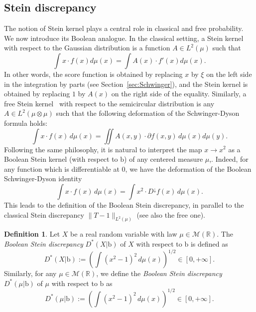 \documentclass[10pt, reqno]{amsart}
\numberwithin{equation}{section}
\theoremstyle{definition}
\newtheorem{definition}{Definition}[section]
\theoremstyle{plain}
\theoremstyle{remark}
\newcommand{\R}{\mathbb{R}}
\newcommand{\1}{\mathbbm{1}}
\begin{document}
\subsection{Stein discrepancy}\label{sec:Stein_discrepancy}The notion of Stein kernel plays a central role in classical and free probability. We now introduce its Boolean analogue. 
In the classical setting, a Stein kernel~\cite{ledoux2015stein} with respect to the Gaussian distribution is a function $A\in L^2(\mu)$ such that
$$\int x\cdot f(x)d\mu(x)=\int A(x)\cdot f'(x)d\mu(x).$$
In other words, the score function is obtained by replacing $x$ by $\xi$ on the left side in the integration by parts (see Section~\ref{sec:Schwinger}), and the Stein kernel is obtained by replacing $1$ by $A(x)$ on the right side of the equality. Similarly, a free Stein kernel~\cite{fathi2017free} with respect to the semicircular distribution is any $A\in L^2(\mu\otimes \mu)$ such that the following deformation of the Schwinger-Dyson formula holds:
$$\int x\cdot  f(x)\,d\mu(x)=\iint  A(x,y)\cdot \partial f(x,y)\,d\mu(x)d\mu(y).$$
Following the same philosophy, it is natural to interpret the map $x\to x^2$ as a Boolean Stein kernel (with respect to $\mathbb{\mathrm{b}}$) of any centered measure $\mu$,. Indeed,  for any function which is differentiable at $0$, we have the deformation of the Boolean Schwinger-Dyson identity
$$\int x\cdot f(x)\,d\mu(x)=\int x^2\cdot D^\downarrow f (x)\,d\mu(x).$$
This leads to the definition of the Boolean Stein discrepancy, in parallel to the classical Stein discrepancy $\|T-1\|_{L^2(\mu)}$ (see also the free one).
\begin{definition}
Let $X$ be a real random variable with law $\mu\in\mathcal{M}(\R)$. The \textit{Boolean Stein discrepancy} $D^*(X|\mathbb{\mathrm{b}})$ of $X$ with respect to $\mathbb{\mathrm{b}}$ is defined as
\begin{equation*}
		D^*(X|\mathbb{\mathrm{b}}):=\left(\int (x^2-1)^2 \,d\mu(x)\right)^{1/2}\in [0,+\infty].
	\end{equation*}
Similarly, for any $\mu \in\mathcal{M}(\R)$, we define the \textit{Boolean Stein discrepancy} $D^*(\mu|\mathbb{\mathrm{b}})$ of $\mu$ with respect to $\mathbb{\mathrm{b}}$ as
\begin{equation*}
		D^*(\mu|\mathbb{\mathrm{b}}):=\left(\int (x^2-1)^2\,d\mu(x)\right)^{1/2}\in [0,+\infty].
	\end{equation*}
\end{definition}    
\end{document}
